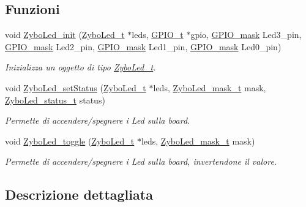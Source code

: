 \subsection*{Funzioni}
\begin{DoxyCompactItemize}
\item 
void \hyperlink{group___zybo_led_ga51b030897fde9b6378d083b8d711008e}{Zybo\+Led\+\_\+init} (\hyperlink{struct_zybo_led__t}{Zybo\+Led\+\_\+t} $\ast$leds, \hyperlink{struct_g_p_i_o__t}{G\+P\+I\+O\+\_\+t} $\ast$gpio, \hyperlink{group___g_p_i_o_ga6d5aef8a8a54ee2f602d47252ff66595}{G\+P\+I\+O\+\_\+mask} Led3\+\_\+pin, \hyperlink{group___g_p_i_o_ga6d5aef8a8a54ee2f602d47252ff66595}{G\+P\+I\+O\+\_\+mask} Led2\+\_\+pin, \hyperlink{group___g_p_i_o_ga6d5aef8a8a54ee2f602d47252ff66595}{G\+P\+I\+O\+\_\+mask} Led1\+\_\+pin, \hyperlink{group___g_p_i_o_ga6d5aef8a8a54ee2f602d47252ff66595}{G\+P\+I\+O\+\_\+mask} Led0\+\_\+pin)
\begin{DoxyCompactList}\small\item\em Inizializza un oggetto di tipo \hyperlink{struct_zybo_led__t}{Zybo\+Led\+\_\+t}. \end{DoxyCompactList}\item 
void \hyperlink{group___zybo_led_gacf5c2b0328c4bdf2d796397fc4510c69}{Zybo\+Led\+\_\+set\+Status} (\hyperlink{struct_zybo_led__t}{Zybo\+Led\+\_\+t} $\ast$leds, \hyperlink{group___zybo_led_gad11701cccac394f7e1f90de8f85695f3}{Zybo\+Led\+\_\+mask\+\_\+t} mask, \hyperlink{group___zybo_led_ga3dcb274f22e577705c49944b8d1f4b12}{Zybo\+Led\+\_\+status\+\_\+t} status)
\begin{DoxyCompactList}\small\item\em Permette di accendere/spegnere i Led sulla board. \end{DoxyCompactList}\item 
void \hyperlink{group___zybo_led_ga20ddd78a98b4c0123c5b964aa0a59046}{Zybo\+Led\+\_\+toggle} (\hyperlink{struct_zybo_led__t}{Zybo\+Led\+\_\+t} $\ast$leds, \hyperlink{group___zybo_led_gad11701cccac394f7e1f90de8f85695f3}{Zybo\+Led\+\_\+mask\+\_\+t} mask)
\begin{DoxyCompactList}\small\item\em Permette di accendere/spegnere i Led sulla board, invertendone il valore. \end{DoxyCompactList}\end{DoxyCompactItemize}


\subsection{Descrizione dettagliata}


